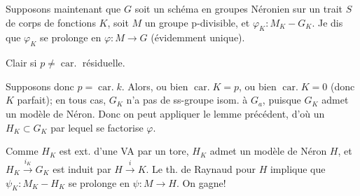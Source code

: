 
Supposons maintenant que $G$ soit un schéma en groupes Néronien sur un trait $S$ de corps de fonctions $K$, soit $M$ un groupe p-divisible, et $\varphi_K:M_K\mathbin{-}G_K$. Je dis que $\varphi_K$ se prolonge en $\varphi:M\longrightarrow G$ (évidemment unique).

Clair si $p\ne\operatorname{car.}$ résiduelle.

Supposons donc $p=\operatorname{car.}k$. Alors, ou bien $\operatorname{car.}K=p$, ou bien $\operatorname{car.}K=0$ (donc $K$ parfait); en tous cas, $G_K$ n'a pas de ss-groupe isom. à $G_a$, puisque $G_K$ admet un modèle de Néron. Donc on peut appliquer le lemme précédent,  d'où un $H_K\subset G_K$ par lequel se factorise $\varphi$.

Comme $H_K$ est ext. d'une VA par un tore, $H_K$ admet un modèle de Néron $H$, et $H_K\xrightarrow{i_K}G_K$ est induit par $H\xrightarrow{i}K$. Le th. de Raynaud pour $H$ implique que $\psi_K:M_K\mathbin{-}H_K$ se prolonge en $\psi:M\longrightarrow H$. On gagne!

